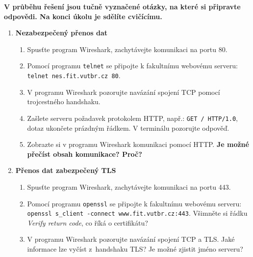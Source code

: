 \documentclass[a4paper,11pt]{article}
\begin{document}
{\bf V průběhu řešení jsou tučně vyznačené otázky, na které si připravte odpovědi.
  Na konci úkolu je sdělíte cvičícímu.}

\begin{enumerate}

  \item {\bf  Nezabezpečený přenos dat}

    \begin{enumerate}

      \item Spusťte program Wireshark, zachytávejte komunikaci na portu 80.

      \item Pomocí programu {\tt telnet} se připojte k fakultnímu webovému
        serveru: \\ \verb|telnet nes.fit.vutbr.cz 80|.

      \item V programu Wireshark pozorujte navázání spojení TCP pomocí
        trojcestného handshaku.

      \item Zašlete serveru požadavek protokolem HTTP, např.:
        \verb|GET / HTTP/1.0|, dotaz ukončete prázdným řádkem. V terminálu pozorujte
        odpověď.

      \item Zobrazte si v programu Wireshark komunikaci pomocí HTTP. {\bf Je možné
        přečíst obsah komunikace? Proč?}

    \end{enumerate}

  \item {\bf Přenos dat zabezpečený TLS}

    \begin{enumerate}

      \item Spusťte program Wireshark, zachytávejte komunikaci na portu 443.

      \item Pomocí programu {\tt openssl} se připojte k fakultnímu webovému
        serveru: \\ \verb|openssl s_client -connect www.fit.vutbr.cz:443|.
        Všimněte si řádku \emph{Verify return code}, co
        říká o certifikátu?

      \item V programu Wireshark pozorujte navázání spojení TCP a TLS. Jaké
        informace lze vyčíst z~handshaku TLS? Je možné zjistit jméno serveru?


\end{enumerate}
\end{enumerate}
\end{document}
